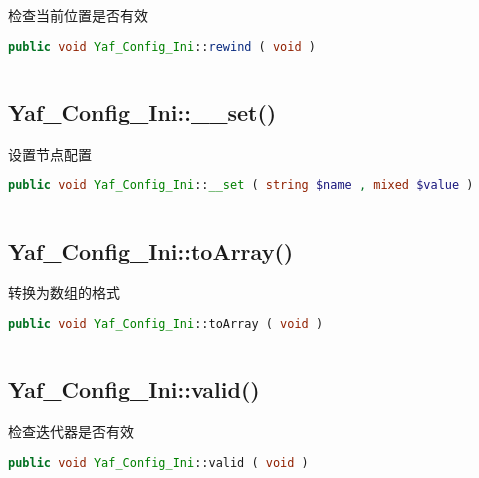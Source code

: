 检查当前位置是否有效

\begin{lstlisting}[language=PHP]
public void Yaf_Config_Ini::rewind ( void )
\end{lstlisting}

\begin{lstlisting}[language=PHP]

\end{lstlisting}



\subsection{Yaf\_Config\_Ini::\_\_set()}

设置节点配置

\begin{lstlisting}[language=PHP]
public void Yaf_Config_Ini::__set ( string $name , mixed $value )
\end{lstlisting}

\begin{lstlisting}[language=PHP]

\end{lstlisting}



\subsection{Yaf\_Config\_Ini::toArray()}

转换为数组的格式

\begin{lstlisting}[language=PHP]
public void Yaf_Config_Ini::toArray ( void )
\end{lstlisting}

\begin{lstlisting}[language=PHP]

\end{lstlisting}



\subsection{Yaf\_Config\_Ini::valid()}

检查迭代器是否有效

\begin{lstlisting}[language=PHP]
public void Yaf_Config_Ini::valid ( void )
\end{lstlisting}


